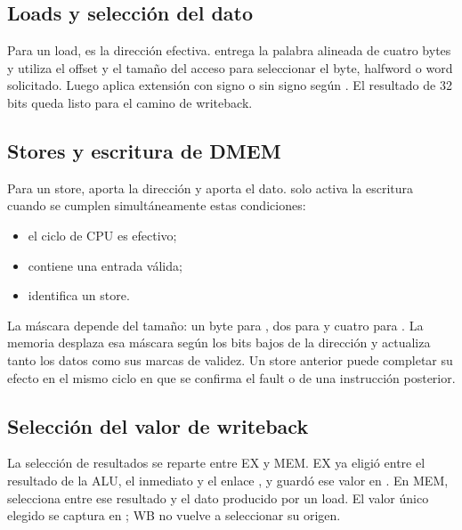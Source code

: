 \subsection{Loads y selección del dato}

Para un load,  es la dirección efectiva.  entrega la palabra alineada de cuatro bytes y 
utiliza el offset y el tamaño del acceso para seleccionar el byte, halfword o
word solicitado. Luego aplica extensión con signo o sin signo según
. El resultado de 32 bits queda listo para el camino de
writeback.

\subsection{Stores y escritura de DMEM}

Para un store,  aporta la dirección y
 aporta el dato.  solo activa
la escritura cuando se cumplen simultáneamente estas condiciones:

\begin{itemize}
  \item el ciclo de CPU es efectivo;
  \item {} contiene una entrada válida;
  \item {} identifica un store.
\end{itemize}

La máscara depende del tamaño: un byte para , dos para  y
cuatro para . La memoria desplaza esa máscara según los bits bajos de
la dirección y actualiza tanto los datos como sus marcas de validez. Un store
anterior puede completar su efecto en el mismo ciclo en que se confirma el
fault o  de una instrucción posterior.

\subsection{Selección del valor de writeback}

La selección de resultados se reparte entre EX y MEM. EX ya eligió entre el
resultado de la ALU, el inmediato y el enlace , y guardó ese valor
en . En MEM,  selecciona entre ese
resultado y el dato producido por un load. El valor único elegido se captura en
; WB no vuelve a seleccionar su origen.


